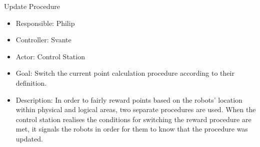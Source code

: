 Update Procedure
\begin{itemize}
    \item Responsible: Philip
    \item Controller: Svante
    \item Actor: Control Station
    \item Goal: Switch the current point calculation procedure according to their definition.
    \item Description: In order to fairly reward points based on the robots' location within physical and logical areas, two separate procedures are used. When the control station realises the conditions for switching the reward procedure are met, it signals the robots in order for them to know that the procedure was updated.
\end{itemize}